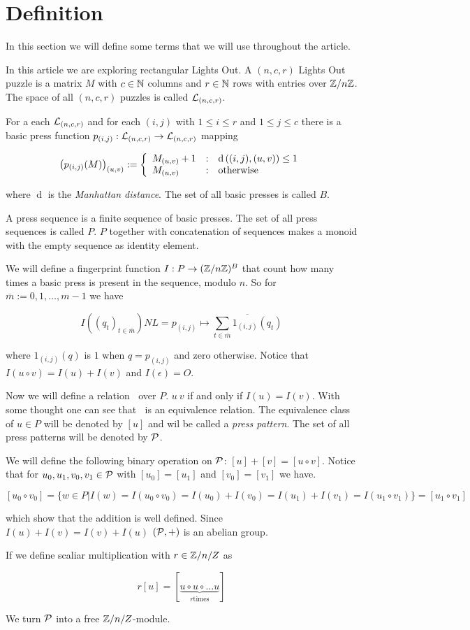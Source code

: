 \section{Definition}
In this section we will define some terms that we will use throughout the article.

In this article we are exploring rectangular Lights Out. A $(n, c, r)$ Lights Out puzzle
is a matrix $M$ with $c\in\mathbb{N}$ columns and $r\in\mathbb{N}$ rows with entries over $\mathbb{Z}/n\mathbb{Z}$. The space
of all $(n, c, r)$ puzzles is called $\mathcal{L}_{(n,c,r)}$.

For a each $\mathcal{L}_{(n,c,r)}$ and for each $(i, j)$ with $1\leq i \leq r$ and $1\leq j \leq c$
there is a basic press function $p_{(i,j)}: \mathcal{L}_{(n,c,r)} \rightarrow \mathcal{L}_{(n,c,r)}$ mapping

\[
    \left(p_{(i,j)}(M)\right)_{(u,v)} :=
    \left\{
    \begin{array}{l@{\quad:\quad}l}
        M_{(u,v)} + 1 & \operatorname{d}\left((i,j), (u,v)\right) \leq 1 \\
        M_{(u,v)} & \text{otherwise}
    \end{array}
    \right.
\]

where $\operatorname{d}$ is the \emph{Manhattan distance}. The set of all basic presses is called $B$.

A press sequence is a finite sequence of basic presses. The set of all press sequences is called $P$.
$P$ together with concatenation of sequences makes a monoid with the empty sequence as identity element.

We will define a fingerprint function $I: P \rightarrow (\mathbb{Z}/n\mathbb{Z})^{B}$ that count how many times a basic press
is present in the sequence, modulo $n$. So for $\overline{m}:={0, 1, \ldots, m-1}$ we have

\[
    I\left((q_t)_{t\in\overline{m}}\right)NL
    =
    p_{(i,j)} \mapsto \overline{\sum_{t\in\overline{m}}1_{(i,j)}(q_{t})}
\]

where $1_{(i,j)}(q)$ is $1$ when $q=p_{(i,j)}$ and zero otherwise. Notice that $I(u\circ v) = I(u) + I(v)$ and $I(\epsilon) = O$.

Now we will define a relation $~$ over $P$. $u ~ v$ if and only if $I(u) = I(v)$. With some thought one
can see that $~$ is an equivalence relation. The equivalence class of $u\in P$ will be denoted by $[u]$
and wil be called a \emph{press pattern}.
The set of all press patterns will be denoted by $\mathcal{P}$.

We will define the following binary operation on $\mathcal{P}$: $[u] + [v] = [u\circ v]$. Notice that for
$u_{0}, u_{1}, v_{0}, v_{1}\in\mathcal{P}$ with $[u_{0}] = [u_{1}]$ and $[v_{0}] = [v_{1}]$ we have.

\[
    [u_{0}\circ v_{0}] = 
    \{w\in P|
    I(w)=I(u_{0}\circ v_{0}) = I(u_{0})+I(v_{0}) = I(u_{1})+I(v_{1}) = I(u_{1}\circ v_{1})
    \} =
    [u_{1}\circ v_{1}]
\]

which show that the addition is well defined. Since $I(u) + I(v) = I(v) + I(u)$
$\left(\mathcal{P}, +\right)$ is an abelian group.

If we define scaliar multiplication with $r\in\mathbb{Z}/n/Z$ as

\[
    r[u] = [\underbrace{u\circ u\circ\ldots u}_{r\text{times}}]
\]

We turn $\mathcal{P}$ into a free $\mathbb{Z}/n/Z$-module.